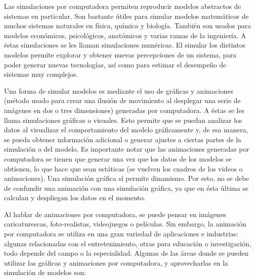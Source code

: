 Las simulaciones por computadora permiten reproducir modelos abstractos de sistemas en particular. Son bastante útiles para simular modelos matemáticos de muchos sistemas naturales en física, química y biología. También son usados para modelos económicos, psicológicos, anatómicos y varias ramas de la ingeniería. A éstas simulaciones se les llaman simulaciones numéricas. El simular los distintos modelos permite explorar y obtener nuevas percepciones de un sistema, para poder generar nuevas tecnologías, así como para estimar el desempeño de sistemas muy complejos.

Una forma de simular modelos es mediante el uso de gráficas y animaciones (método usado para crear una ilusión de movimiento al desplegar una serie de imágenes en dos o tres dimensiones) generadas por computadora. A éstas se les llama simulaciones gráficas o visuales. Esto permite que se puedan analizar los datos al visualizar el comportamiento del modelo gráficamente y, de esa manera, se pueda obtener información adicional o generar ajustes a ciertas partes de la simulación o del modelo. Es importante notar que las animaciones generadas por computadora se tienen que generar una vez que los datos de los modelos se obtienen, lo que hace que sean estáticas (se vuelven los cuadros de los videos o animaciones). Una simulación gráfica sí permite dinamismo. Por esto, no se debe de confundir una animación con una simulación gráfica, ya que en ésta última se calculan y despliegan los datos en el momento. 

Al hablar de animaciones por computadora, se puede pensar en imágenes caricaturescas, foto-realistas, videojuegos o películas. Sin embargo, la animación por computadora se utiliza en una gran variedad de aplicaciones e industrias: algunas relacionadas con el entretenimiento, otras para educación o investigación, todo depende del campo o la especialidad. Algunas de las áreas donde se pueden utilizar las gráficas y animaciones por computadora, y aprovecharlas en la simulación de modelos son:

